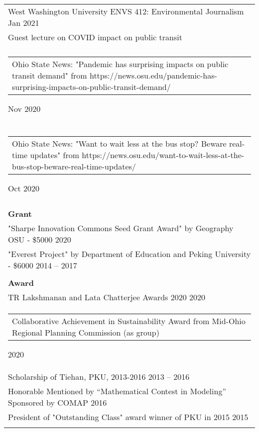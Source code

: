 \documentclass[letterpaper, 11pt]{article}
\begin{document}
\begin{longtable}{p{6.5in}}
West Washington University ENVS 412: Environmental Journalism \hfill Jan 2021\\
Guest lecture on COVID impact on public transit \\\\

\begin{tabular}{p{5in}}
Ohio State News: "Pandemic has surprising impacts on public transit demand" from https://news.osu.edu/pandemic-has-surprising-impacts-on-public-transit-demand/
\end{tabular} \hfill Nov 2020 \\\\

\begin{tabular}{p{5in}}
Ohio State News: "Want to wait less at the bus stop? Beware real-time updates" from https://news.osu.edu/want-to-wait-less-at-the-bus-stop-beware-real-time-updates/ 
\end{tabular} \hfill Oct 2020 \\\\

\textbf{Grant} \\
"Sharpe Innovation Commons Seed Grant Award" by Geography OSU - \$5000 \hfill 2020 \\
"Everest Project" by Department of Education and Peking University - \$6000 \hfill 2014 -- 2017 \\\\

\textbf{Award} \\
TR Lakshmanan and Lata Chatterjee Awards 2020 \hfill 2020 \\
\begin{tabular}{p{5in}}
Collaborative Achievement in Sustainability Award from Mid-Ohio Regional Planning Commission (as group) \end{tabular}\hfill 2020 \\
Scholarship of Tiehan, PKU, 2013-2016 \hfill 2013 -- 2016 \\
Honorable Mentioned by “Mathematical Contest in Modeling” Sponsored by COMAP \hfill 2016 \\
President of "Outstanding Class" award winner of PKU in 2015 \hfill 2015 \\\\


\end{longtable}
\end{document}
